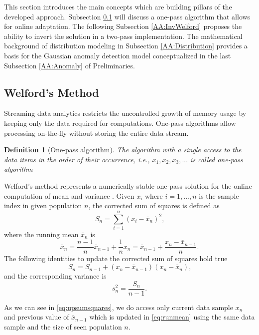 This section introduces the main concepts which are building pillars of the developed approach. Subsection \ref{AA:Welford} will discuss a one-pass algorithm that allows for online adaptation. The following Subsection \ref{AA:InvWelford} proposes the ability to invert the solution in a two-pass implementation. The mathematical background of distribution modeling in Subsection \ref{AA:Distribution} provides a basis for the Gaussian anomaly detection model conceptualized in the last Subsection \ref{AA:Anomaly} of Preliminaries.

\subsection{Welford's Method}\label{AA:Welford}
Streaming data analytics restricts the uncontrolled growth of memory usage by keeping only the data required for computations. One-pass algorithms allow processing on-the-fly without storing the entire data stream.
\newtheorem{definition}{Definition}[section]
\begin{definition}[One-pass algorithm]
The algorithm with a single access to the data items in the order of their occurrence, i.e., \(x_1,x_2,x_3,...\) is called one-pass algorithm \cite{Schw09}
\end{definition}

Welford's method represents a numerically stable one-pass solution for the online computation of mean and variance \cite{Wel62}.
Given \(x_i\) where \(i=1,...,n\) is the sample index in given population  \(n\), the corrected sum of squares is defined as
\begin{equation}
S_n = \sum_{i=1}^n (x_i - \bar x_n)^2\text{,}\label{eq:sumsquares}
\end{equation}
where the running mean \(\bar x_n\) is
\begin{equation}
\bar x_n = \frac{n-1}{n} \bar x_{n-1} + \frac{1}{n}x_n = \bar x_{n-1} + \frac{x_n - \bar x_{n-1}}{n}\text{.}\label{eq:runmean}
\end{equation}
The following identities to update the corrected sum of squares hold true
\begin{equation}
S_n = S_{n-1} + (x_n - \bar x_{n-1})(x_n - \bar x_n)\text{,}\label{eq:upsumsquares}
\end{equation}
and the corresponding variance is
\begin{equation}
s^2_n = \frac{S_{n}}{n-1}\text{.}\label{eq:runvar}
\end{equation}

As we can see in \eqref{eq:upsumsquares}, we do access only current data sample \(x_n\) and previous value of \(\bar x_{n-1}\) which is updated in \eqref{eq:runmean} using the same data sample and the size of seen population \(n\).

